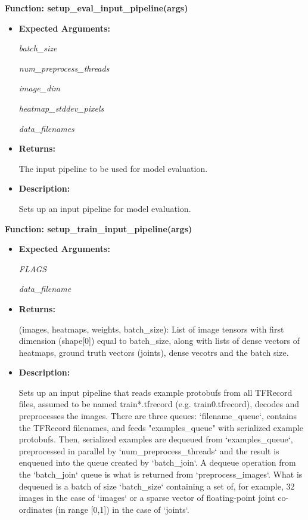 \documentclass{scrreprt}
\begin{document}
\textbf{Function: setup\_eval\_input\_pipeline(args)}
\begin{itemize}
    \item \textbf{Expected Arguments:}

            \quad\textit{batch\_size}

            \quad\textit{num\_preprocess\_threads}

            \quad\textit{image\_dim}

            \quad\textit{heatmap\_stddev\_pixels}

            \quad\textit{data\_filenames}

    \item \textbf{Returns:}

            The input pipeline to be used for model evaluation.

    \item \textbf{Description:}

            Sets up an input pipeline for model evaluation.
\end{itemize}

\textbf{Function: setup\_train\_input\_pipeline(args)}
\begin{itemize}
    \item \textbf{Expected Arguments:}

            \quad\textit{FLAGS}

            \quad\textit{data\_filename}

    \item \textbf{Returns:}

            (images, heatmaps, weights, batch_size): List of image tensors with first dimension (shape[0]) equal to batch_size, along with lists of dense vectors of heatmaps, ground truth vectors (joints), dense vecotrs and the batch size. 

    \item \textbf{Description:}

            Sets up an input pipeline that reads example protobufs from all TFRecord files, assumed to be named train*.tfrecord (e.g. train0.tfrecord), decodes and preprocesses the images.
            There are three queues: `filename\_queue`, contains the TFRecord filenames, and feeds "examples\_queue" with serialized example protobufs.
            Then, serialized examples are dequeued from `examples\_queue`, preprocessed in parallel by `num\_preprocess\_threads` and the result is enqueued into the queue created by `batch\_join`. A dequeue operation from the `batch\_join` queue is what is returned from `preprocess\_images`. What is dequeued is a batch of size `batch\_size` containing a set of, for example, 32 images in
            the case of `images` or a sparse vector of floating-point joint
            co-ordinates (in range [0,1]) in the case of `joints`.

\end{itemize}
\end{document}
